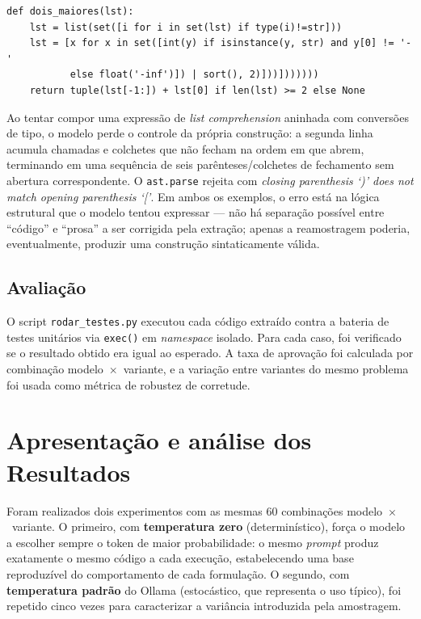 \documentclass[12pt,
    english,
    french,
    spanish,
    brazil,
    ]{article}
\begin{document}
\begin{lstlisting}[style=python, caption={deepseek-coder em P5\_vago — aninhamento de parênteses e colchetes fora de controle}]
def dois_maiores(lst):
    lst = list(set([i for i in set(lst) if type(i)!=str]))
    lst = [x for x in set([int(y) if isinstance(y, str) and y[0] != '-'
           else float('-inf')]) | sort(), 2)]))]))))))
    return tuple(lst[-1:]) + lst[0] if len(lst) >= 2 else None
\end{lstlisting}

Ao tentar compor uma expressão de \textit{list comprehension} aninhada
com conversões de tipo, o modelo perde o controle da própria construção:
a segunda linha acumula chamadas e colchetes que não fecham na ordem em
que abrem, terminando em uma sequência de seis parênteses/colchetes de
fechamento sem abertura correspondente. O \texttt{ast.parse} rejeita com
\textit{closing parenthesis `)' does not match opening parenthesis
`['}. Em ambos os exemplos, o erro está na lógica estrutural que o
modelo tentou expressar — não há separação possível entre ``código'' e
``prosa'' a ser corrigida pela extração; apenas a reamostragem poderia,
eventualmente, produzir uma construção sintaticamente válida.

\subsection{Avaliação}

O script \texttt{rodar\_testes.py} executou cada código extraído
contra a bateria de testes unitários via \texttt{exec()} em
\textit{namespace} isolado. Para cada caso, foi verificado se o
resultado obtido era igual ao esperado. A taxa de aprovação foi
calculada por combinação modelo~$\times$~variante, e a variação entre
variantes do mesmo problema foi usada como métrica de robustez de
corretude.
\section{Apresentação e análise dos Resultados}

Foram realizados dois experimentos com as mesmas 60 combinações modelo~$\times$~variante. O primeiro, com \textbf{temperatura zero} (determinístico), força o modelo a escolher sempre o token de maior probabilidade: o mesmo \textit{prompt} produz exatamente o mesmo código a cada execução, estabelecendo uma base reproduzível do comportamento de cada formulação. O segundo, com \textbf{temperatura padrão} do Ollama (estocástico, que representa o uso típico), foi repetido cinco vezes para caracterizar a variância introduzida pela amostragem.
\end{document}
